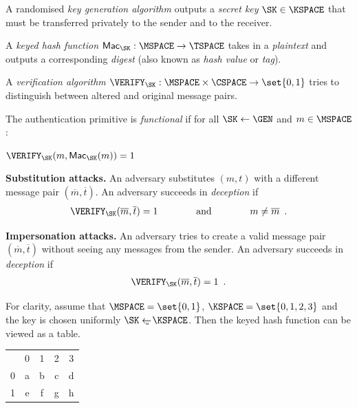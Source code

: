 \documentclass[landscape,footrule]{foils}
\begin{document}
\vspace*{1ex}
\begin{triangles}
\item A randomised \emph{key generation algorithm} outputs a
  \emph{secret key} $\SK\in\KSPACE$ that must be transferred
  privately to the sender and to the receiver.
\item A \emph{keyed hash function} $\MAC_\SK:\MSPACE\to\TSPACE$ takes
  in a \emph{plaintext} and outputs a corresponding \emph{digest}
  (also known as \emph{hash value} or \emph{tag}).
\item A \emph{verification algorithm}
  $\VERIFY_\SK:\MSPACE\times\CSPACE\to\set{0,1}$ tries to distinguish
  between altered and original message pairs.
\item The authentication primitive is \emph{functional} if for all
  $\SK\gets\GEN$ and $m\in\MSPACE$:
  \centerline{$\VERIFY_\SK(m,\MAC_\SK(m))=1$}
\end{triangles}


\textbf{Substitution attacks.}  An adversary substitutes $(m,t)$
  with a different message pair $(\overline{m},\overline{t})$. An
  adversary succeeds in \emph{deception} if
  \begin{align*}
    \VERIFY_\SK(\overline{m},\overline{t})=1
   \qquad\qquad\text{and}\qquad\qquad
    m \neq\overline{m}\enspace.
  \end{align*}
\bigskip

\textbf{Impersonation attacks.}  An adversary tries to create a
  valid message pair $(\overline{m},\overline{t})$ without seeing any
  messages from the sender. An adversary succeeds in
  \emph{deception} if
  \begin{align*}
    \VERIFY_\SK(\overline{m},\overline{t})=1\enspace.
  \end{align*}



For clarity, assume that $\MSPACE=\set{0,1}$, $\KSPACE=\set{0,1,2,3}$
and the key is chosen uniformly $\SK\getsu\KSPACE$. Then the keyed
hash function can be viewed as a table.
\begin{center}
  \begin{tabular}{c|c|c|c|c|}
   \multicolumn{1}{c}{  }
   &\multicolumn{1}{c}{0}
   &\multicolumn{1}{c}{1}
   &\multicolumn{1}{c}{2}
   &\multicolumn{1}{c}{3}\\
   \cline{2-5}
    0 & a & b & c & d\\
   \cline{2-5}
    1 & e & f & g & h\\
   \cline{2-5}
  \end{tabular}
\end{center}
\bigskip 
\end{document}
